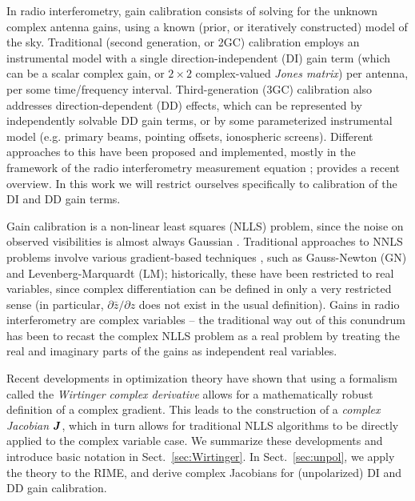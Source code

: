 \documentclass[useAMS,usenatbib]{mn2e}
\newcommand{\mat}[1]{{\bmath{#1}}}
\newcommand{\JJ}{\mat{J}} %
\begin{document}
In radio interferometry, gain calibration consists of solving for the unknown complex antenna gains,
using a known (prior, or iteratively constructed) model of the sky. Traditional (second generation, or 2GC)
calibration employs an instrumental model with a single direction-independent (DI) gain term (which
can be a scalar complex gain, or $2\times2$ complex-valued {\em Jones matrix}) per antenna, per some 
time/frequency interval. Third-generation (3GC) calibration also addresses direction-dependent (DD) effects, which can be 
represented by independently solvable DD gain terms, or by some parameterized instrumental 
model (e.g. primary beams, pointing offsets, ionospheric screens). Different approaches to 
this have been proposed and implemented, mostly in the framework of the radio interferometry measurement equation
\citep[RIME, see][]{ME1}; \citet{RRIME1,RRIME2,RRIME3} provides a recent overview. In this work we will restrict 
ourselves specifically to calibration of the DI and DD gain terms.

Gain calibration is a non-linear least squares (NLLS) problem, since the noise on observed visibilities is 
almost always Gaussian \citep[though other treatments have been proposed by][]{Kazemi2013a}. Traditional approaches
to NNLS problems involve various gradient-based techniques \citep[for an overview, see][]{Madsen-NLLS}, such as 
Gauss-Newton (GN) and Levenberg-Marquardt (LM); historically, these have been restricted to real variables, 
since complex differentiation can be defined in only a very restricted sense (in particular, $\partial\bar z/\partial z$
does not exist in the usual definition). Gains in radio interferometry are complex variables -- the traditional 
way out of this conundrum has been to recast the complex NLLS problem as a real problem by treating the real 
and imaginary parts of the gains as independent real variables.



Recent developments in optimization theory \citep{ComplexOpt} have shown that using a formalism 
called the {\em Wirtinger complex derivative} allows for a mathematically robust definition of a 
complex gradient. This leads to the construction of a {\em complex Jacobian} $\JJ$, which in turn allows for traditional 
NLLS algorithms to be directly applied to the complex variable case. We summarize these developments and 
introduce basic notation in Sect.~\ref{sec:Wirtinger}. In Sect.~\ref{sec:unpol}, we apply 
the theory to the RIME, and derive complex Jacobians for (unpolarized) DI and DD gain calibration.
\end{document}
